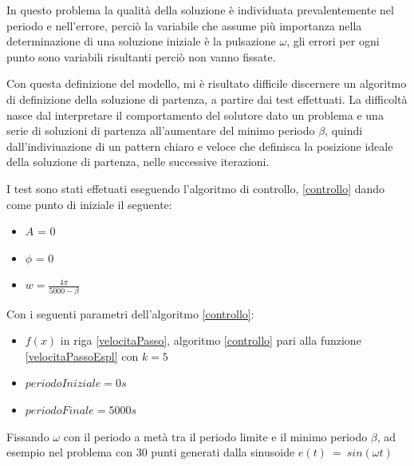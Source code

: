\documentclass[a4paper,12pt]{report}
\begin{document}
In questo problema la qualità della soluzione è individuata prevalentemente nel periodo e nell'errore, perciò la variabile che assume più importanza nella determinazione di una soluzione iniziale è la pulsazione $\omega$, gli errori per ogni punto sono variabili risultanti perciò non vanno fissate.

Con questa definizione del modello, mi è risultato difficile discernere un algoritmo di definizione della soluzione di partenza, a partire dai test effettuati. La difficoltà nasce dal interpretare il comportamento del solutore dato un problema e una serie di soluzioni di partenza all'aumentare del minimo periodo $ \beta $, quindi dall'indiviuazione di un pattern chiaro e veloce che definisca la posizione ideale della soluzione di partenza, nelle successive iterazioni.

I test sono stati effetuati eseguendo l'algoritmo di controllo, \ref{controllo} dando come punto di iniziale il seguente:
\begin{itemize}
  \item $A$ = 0
  \item $\phi$ = 0
  \item $w = \frac{4\pi}{5000 - \beta}$
\end{itemize}

Con i seguenti parametri dell'algoritmo \ref{controllo}:
\begin{itemize}
  \item $f(x)$ in riga \ref{velocitaPasso}, algoritmo \ref{controllo} pari alla funzione \eqref{velocitaPassoEspl} con $k = 5$
  \item $periodoIniziale = 0s$
  \item $periodoFinale = 5000s$
\end{itemize}

Fissando $ \omega $ con il periodo a metà tra il periodo limite e il minimo periodo $\beta$, ad esempio nel problema con 30 punti generati dalla sinusoide $ e(t)~=~sin(\omega t)$
\end{document}
